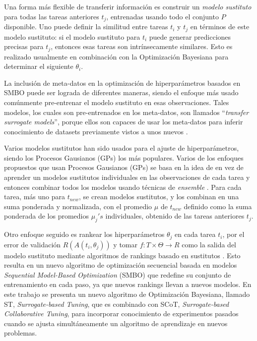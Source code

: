 \quad

Una forma más flexible de transferir información es construir un \textit{modelo sustituto} para todas las tareas anteriores $t_j$, entrenadas usando todo el conjunto $P$ disponible. Uno puede definir la similitud entre tareas $t_i$ y $t_j$ en términos de este modelo sustituto: si el modelo sustituto para $t_i$ puede generar predicciones precisas para $t_{j}$, entonces esas tareas son intrínsecamente similares. Esto es realizado usualmente en combinación con la Optimización Bayesiana para determinar el siguiente $\theta_i$. 

La inclusión de meta-datos en la optimización de hiperparámetros basados en SMBO puede ser lograda de diferentes maneras, siendo el enfoque más usado comúnmente pre-entrenar el modelo sustituto en esas observaciones. Tales modelos, los cuales son pre-entrenados en los meta-datos, son llamados ``\textit{transfer surrogate models}'', porque ellos son capaces de usar los meta-datos para inferir conocimiento de datasets previamente vistos a unos nuevos \cite{witsuba2018scalable}.

Varios modelos sustitutos han sido usados para el ajuste de hiperparámetros, siendo los Procesos Gausianos (GPs) los más populares. Varios de los enfoques propuestos que usan Procesos Gausianos (GPs) se basa en la idea de en vez de aprender un modelos sustitutos individuales en las observaciones de cada tarea y entonces combinar todos los modelos usando técnicas de \textit{ensemble} \cite{witsuba2015learning, witsuba2018scalable}. Para cada tarea, más uno para $t_{new}$, se crean modelos sustitutos, y los combinan en una suma ponderada y normalizada, con el promedio $\mu$ de $t_{new}$ definido como la suma ponderada de los promedios $\mu_j's$ individuales, obtenido de las tareas anteriores $t_j$. 

Otro enfoque seguido es rankear los hiperparámetros $\theta_j$ en cada tarea $t_i$, por el error de validación $R(A(t_i, \theta_j))$ y tomar  $f: T \times \Theta \rightarrow R$ como la salida del modelo sustituto mediante algoritmos de rankings basado en sustitutos \cite{bardenet2013hyper, yogatama2014efficient}. Esto resulta en un nuevo algoritmo de optimización secuencial basada en modelos \textit{Sequential Model-Based Optimization} (SMBO) que redefine su conjunto de entrenamiento en cada paso, ya que nuevos rankings llevan a nuevos modelos. En este trabajo se presenta un nuevo algoritmo de Optimización Bayesiana, llamado ST, \textit{Surrogate-based Tuning}, que es combinado con SCoT, \textit{Surrogate-based Collaborative Tuning}, para incorporar conocimiento de experimentos pasados cuando se ajusta simultáneamente un algoritmo de aprendizaje en nuevos problemas.

